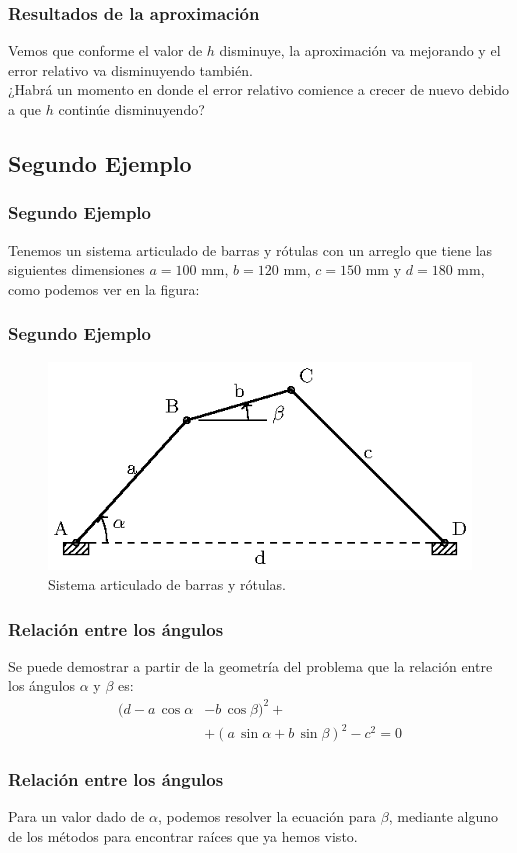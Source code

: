 \begin{frame}
\frametitle{Resultados de la aproximación}
Vemos que conforme el valor de $h$ disminuye, la aproximación va mejorando y el error relativo va disminuyendo también.
\\
\bigskip
\pause
¿Habrá un momento en donde el error relativo comience a crecer de nuevo debido a que $h$ continúe disminuyendo?
\end{frame}
\subsection*{Segundo Ejemplo}
\begin{frame}
\frametitle{Segundo Ejemplo}
Tenemos un sistema articulado de barras y rótulas con un arreglo que tiene las siguientes dimensiones $a=100$ mm, $b=120$ mm, $c=150$ mm y $d=180$ mm, como podemos ver en la figura:
\end{frame}
\begin{frame}
\frametitle{Segundo Ejemplo}
\begin{figure}[h!]
    \centering
    \includegraphics[scale=1.2]{Imagenes/Ejercicio_Diferenciacion_02.eps}
    \caption{Sistema articulado de barras y rótulas.}
\end{figure}
\end{frame}
\begin{frame}
\frametitle{Relación entre los ángulos}
Se puede demostrar a partir de la geometría del problema que la relación entre los ángulos $\alpha$ y $\beta$ es:
\begin{align*}
(d - a \, \cos \alpha &- b \, \cos \beta)^{2} + \\
&+ (a \,  \sin \alpha + b \, \sin \beta)^{2} - c^{2} = 0
\end{align*}
\end{frame}
\begin{frame}
\frametitle{Relación entre los ángulos}
Para un valor dado de $\alpha$, podemos resolver la ecuación para $\beta$, mediante alguno de los métodos para encontrar raíces que ya hemos visto.
\end{frame}
